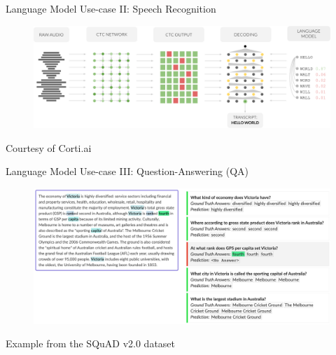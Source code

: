 \begin{frame}{Language Model Use-case II: Speech Recognition}
    
    \begin{figure}
        \centering
        \includegraphics[width=\textwidth]{graphics/use-cases/ctc_network.png}
    \end{figure}
    {\footnotesize Courtesy of Corti.ai}
\end{frame}

\begin{frame}{Language Model Use-case III: Question-Answering (QA)}
    \begin{figure}
        \centering
        \includegraphics[height=0.8\textheight]{graphics/use-cases/question-answering.png}
    \end{figure}
    {\footnotesize Example from the SQuAD v2.0 dataset}
\end{frame}

